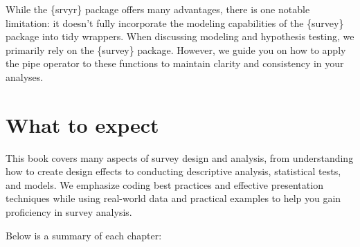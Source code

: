 \documentclass[
]{krantz}
\begin{document}
While the \{srvyr\} package offers many advantages, there is one notable limitation: it doesn't fully incorporate the modeling capabilities of the \{survey\} package into tidy wrappers. When discussing modeling and hypothesis testing, we primarily rely on the \{survey\} package. However, we guide you on how to apply the pipe operator to these functions to maintain clarity and consistency in your analyses.

\hypertarget{what-to-expect}{%
\section{What to expect}\label{what-to-expect}}

This book covers many aspects of survey design and analysis, from understanding how to create design effects to conducting descriptive analysis, statistical tests, and models. We emphasize coding best practices and effective presentation techniques while using real-world data and practical examples to help you gain proficiency in survey analysis.

Below is a summary of each chapter:
\end{document}
